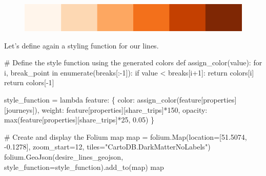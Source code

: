 \documentclass[
  letterpaper,
  DIV=11,
  numbers=noendperiod]{scrreprt}
\newenvironment{Shaded}{\begin{snugshade}}{\end{snugshade}}
\newcommand{\BuiltInTok}[1]{\textcolor[rgb]{0.00,0.23,0.31}{#1}}
\newcommand{\CommentTok}[1]{\textcolor[rgb]{0.37,0.37,0.37}{#1}}
\newcommand{\ControlFlowTok}[1]{\textcolor[rgb]{0.00,0.23,0.31}{#1}}
\newcommand{\DecValTok}[1]{\textcolor[rgb]{0.68,0.00,0.00}{#1}}
\newcommand{\FloatTok}[1]{\textcolor[rgb]{0.68,0.00,0.00}{#1}}
\newcommand{\KeywordTok}[1]{\textcolor[rgb]{0.00,0.23,0.31}{#1}}
\newcommand{\NormalTok}[1]{\textcolor[rgb]{0.00,0.23,0.31}{#1}}
\newcommand{\OperatorTok}[1]{\textcolor[rgb]{0.37,0.37,0.37}{#1}}
\newcommand{\StringTok}[1]{\textcolor[rgb]{0.13,0.47,0.30}{#1}}
\begin{document}
\begin{figure}[H]

{\centering \includegraphics{labs/w04_interactive_files/figure-pdf/cell-33-output-1.png}

}

\end{figure}

Let's define again a styling function for our lines.

\begin{Shaded}
\begin{Highlighting}[]
\CommentTok{\# Define the style function using the generated colors}
\KeywordTok{def}\NormalTok{ assign\_color(value):}
    \ControlFlowTok{for}\NormalTok{ i, break\_point }\KeywordTok{in} \BuiltInTok{enumerate}\NormalTok{(breaks[:}\OperatorTok{{-}}\DecValTok{1}\NormalTok{]):}
        \ControlFlowTok{if}\NormalTok{ value }\OperatorTok{\textless{}}\NormalTok{ breaks[i}\OperatorTok{+}\DecValTok{1}\NormalTok{]:}
            \ControlFlowTok{return}\NormalTok{ colors[i]}
    \ControlFlowTok{return}\NormalTok{ colors[}\OperatorTok{{-}}\DecValTok{1}\NormalTok{]}

\NormalTok{style\_function }\OperatorTok{=} \KeywordTok{lambda}\NormalTok{ feature: \{}
    \StringTok{\textquotesingle{}color\textquotesingle{}}\NormalTok{: assign\_color(feature[}\StringTok{\textquotesingle{}properties\textquotesingle{}}\NormalTok{][}\StringTok{\textquotesingle{}journeys\textquotesingle{}}\NormalTok{]),}
    \StringTok{\textquotesingle{}weight\textquotesingle{}}\NormalTok{: feature[}\StringTok{\textquotesingle{}properties\textquotesingle{}}\NormalTok{][}\StringTok{\textquotesingle{}share\_trips\textquotesingle{}}\NormalTok{]}\OperatorTok{*}\DecValTok{150}\NormalTok{,  }
    \StringTok{\textquotesingle{}opacity\textquotesingle{}}\NormalTok{: }\BuiltInTok{max}\NormalTok{(feature[}\StringTok{\textquotesingle{}properties\textquotesingle{}}\NormalTok{][}\StringTok{\textquotesingle{}share\_trips\textquotesingle{}}\NormalTok{]}\OperatorTok{*}\DecValTok{25}\NormalTok{, }\FloatTok{0.05}\NormalTok{)}
\NormalTok{\}}
\end{Highlighting}
\end{Shaded}

\begin{Shaded}
\begin{Highlighting}[]
\CommentTok{\# Create and display the Folium map}
\BuiltInTok{map} \OperatorTok{=}\NormalTok{ folium.Map(location}\OperatorTok{=}\NormalTok{[}\FloatTok{51.5074}\NormalTok{, }\OperatorTok{{-}}\FloatTok{0.1278}\NormalTok{], zoom\_start}\OperatorTok{=}\DecValTok{12}\NormalTok{, tiles}\OperatorTok{=}\StringTok{"CartoDB.DarkMatterNoLabels"}\NormalTok{)}
\NormalTok{folium.GeoJson(desire\_lines\_geojson, style\_function}\OperatorTok{=}\NormalTok{style\_function).add\_to(}\BuiltInTok{map}\NormalTok{)}
\BuiltInTok{map}
\end{Highlighting}
\end{Shaded}
\end{document}
